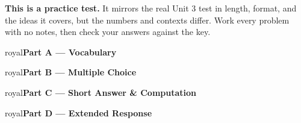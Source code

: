 \documentclass[10pt]{article}
\newcommand{\parthead}[1]{%
  \vspace{6pt}\noindent
  \begin{headlinebox}{royal}{\color{white}\bfseries #1}\end{headlinebox}%
  \vspace{4pt}}
\begin{document}
\namedateperiod

\vspace{0.10in}
\begin{remindbox}
\small
\textbf{This is a practice test.} It mirrors the real Unit 3 test in length, format,
and the ideas it covers, but the numbers and contexts differ. Work every problem
with no notes, then check your answers against the key.
\end{remindbox}

\parthead{Part A --- Vocabulary}

\parthead{Part B --- Multiple Choice}

\parthead{Part C --- Short Answer \& Computation}

\parthead{Part D --- Extended Response}
\end{document}
